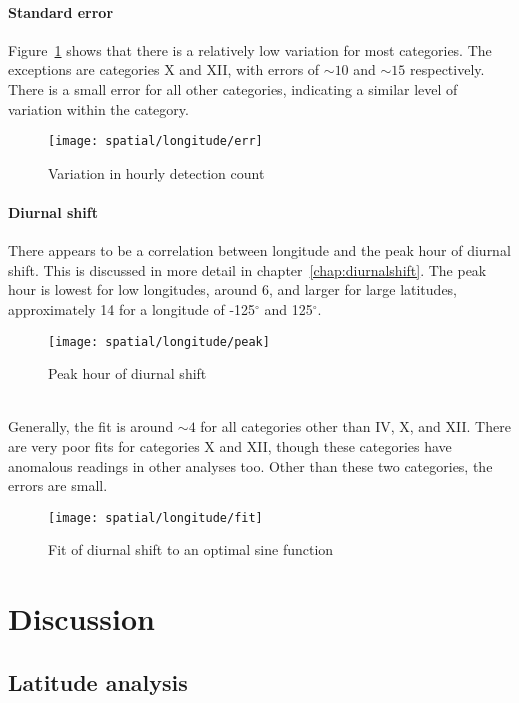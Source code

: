 \paragraph{Standard error\\}
Figure~\ref{fig:spat:lon:err} shows that there is a relatively low variation for most categories. The exceptions are categories X and XII, with errors of $\sim 10$ and $\sim 15$ respectively. There is a small error for all other categories, indicating a similar level of variation within the category.
\begin{figure}[h!]
	\centering
	\texttt{[image: spatial/longitude/err]}
	\caption{Variation in hourly detection count
		\label{fig:spat:lon:err}}
\end{figure}
\paragraph{Diurnal shift\\}
There appears to be a correlation between longitude and the peak hour of diurnal shift. This is discussed in more detail in chapter~\ref{chap:diurnalshift}. The peak hour is lowest for low longitudes, around 6, and larger for large latitudes, approximately 14 for a longitude of -125$^{\circ}$ and 125$^{\circ}$.
\begin{figure}[h!]
	\centering
	\texttt{[image: spatial/longitude/peak]}
	\caption{Peak hour of diurnal shift
		\label{fig:spat:lon:peak}}
\end{figure}\\
Generally, the fit is around $\sim 4$ for all categories other than IV, X, and XII. There are very poor fits for categories X and XII, though these categories have anomalous readings in other analyses too. Other than these two categories, the errors are small.
\begin{figure}[h!]
	\centering
	\texttt{[image: spatial/longitude/fit]}
	\caption{Fit of diurnal shift to an optimal sine function
		\label{fig:spat:lon:fit}}
\end{figure}

\section{Discussion}
\subsection{Latitude analysis}
